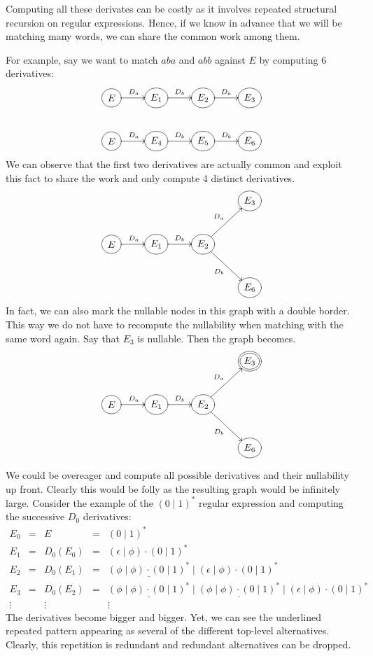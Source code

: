 Computing all these derivates can be costly as it involves repeated structural
recursion on regular expressions. Hence, if we know in advance that we will be
matching many words, we can share the common work among them. 
\begin{example}
For example,
say we want to match $aba$ and $abb$ against $E$ by computing 6 derivatives:
\begin{equation*}
\atm\xymatrix{
  E   \ar[r]^{D_a} &  E_1 \ar[r]^{D_b} &  E_2 \ar[r]^{D_a} &  E_3 \\
  E   \ar[r]^{D_a} &  E_4 \ar[r]^{D_b} &  E_5 \ar[r]^{D_b} &  E_6
}
\end{equation*}
\newpage
We can observe that the first two derivatives are actually common and exploit this
fact to share the work and only compute 4 distinct derivatives.
\begin{equation*}
\atm\xymatrix{
*{} & *{} & *{} & E_3 \\
E \ar[r]^{D_a} & E_1 \ar[r]^{D_b} & E_2 \ar[ur]^{D_a}\ar[dr]_{D_b} & *{} \\
*{} & *{} & *{} & E_6
}
\end{equation*}
In fact, we can also mark the nullable nodes in this graph with a double border.
This way we do not have to recompute the nullability when matching with the same
word again. Say that $E_3$ is nullable. Then the graph becomes.
\begin{equation*}
\atm\xymatrix{
*{} & *{} & *{} & \accept{E_3} \\
E \ar[r]^{D_a} & E_1 \ar[r]^{D_b} & E_2 \ar[ur]^{D_a}\ar[dr]_{D_b} & *{} \\
*{} & *{} & *{} & E_6
}
\end{equation*}
\end{example}
We could be overeager and compute all possible derivatives and their nullability
up front. Clearly this would be folly as the resulting graph would be infinitely
large. Consider the example of the $(0 \mid 1)^*$ regular expression and
computing the successive $D_0$ derivatives:
\begin{equation*}
\begin{array}{rcccl}
  E_0 & = & E        & = & (0 \mid 1)^* \\
  E_1 & = & D_0(E_0) & = & (\epsilon \mid \phi) \cdot (0 \mid 1)^* \\
  E_2 & = & D_0(E_1) & = & \underline{(\phi\mid \phi) \cdot (0 \mid 1)^*} \mid (\epsilon \mid \phi) \cdot (0 \mid 1)^* \\
  E_3 & = & D_0(E_2) & = & \underline{(\phi\mid \phi) \cdot (0 \mid 1)^*} \mid \underline{(\phi\mid \phi) \cdot (0 \mid 1)^*} \mid (\epsilon \mid \phi) \cdot (0 \mid 1)^* \\
  \vdots & & \vdots & & \vdots
\end{array}
\end{equation*}
The derivatives become bigger and bigger. Yet, we can see the underlined
repeated pattern appearing as several of the different top-level alternatives.
Clearly, this repetition is redundant and redundant alternatives can be dropped.

